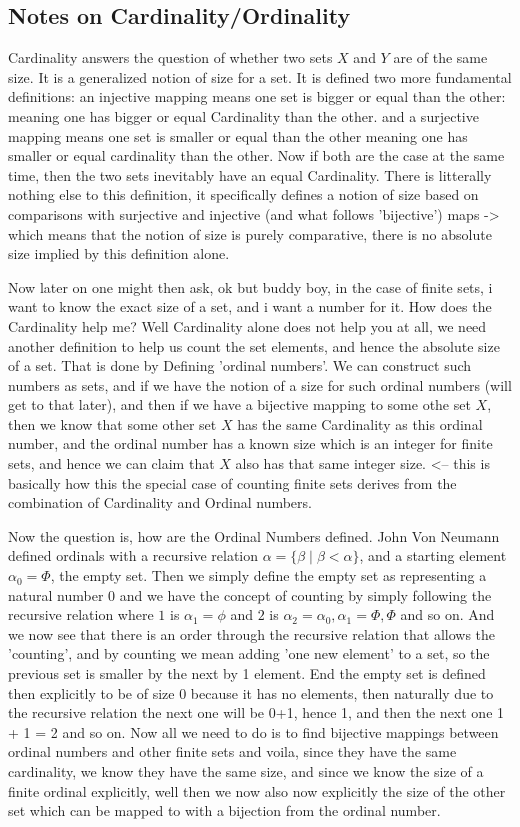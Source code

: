 \documentclass[11pt,a4paper]{article}
\begin{document}
\subsection{Notes on Cardinality/Ordinality}
Cardinality answers the question of whether two sets $X$ and $Y$ are of the same size.
It is a generalized notion of size for a set. It is defined two more fundamental
definitions: an injective mapping means one set is bigger or equal than the other:
meaning one has bigger or equal Cardinality than the other.
and a surjective mapping means one set is smaller or equal than the other meaning one
has smaller or equal cardinality than the other. Now
if both are the case at the same time, then the two sets inevitably have an equal Cardinality.
There is litterally nothing else to this definition, it specifically defines a notion
of size based on comparisons with surjective and injective (and what follows 'bijective')
maps -> which means that the notion of size is purely comparative, there is no absolute
size implied by this definition alone.

Now later on one might then ask, ok but buddy boy, in the case of finite sets, i want to
know the exact size of a set, and i want a number for it. How does the Cardinality help
me? Well Cardinality alone does not help you at all, we need another definition to help
us count the set elements, and hence the absolute size of a set. That is done by Defining
'ordinal numbers'. We can construct such numbers as sets, and if we have the notion of
a size for such ordinal numbers (will get to that later), and then if we have a bijective
mapping to some othe set $X$, then we know that some other set $X$ has the same Cardinality
as this ordinal number, and the ordinal number has a known size which is an integer for finite
sets, and hence we can claim that $X$ also has that same integer size. <-- this is basically
how this the special case of counting finite sets derives from the combination of Cardinality
and Ordinal numbers.

Now the question is, how are the Ordinal Numbers defined. John Von Neumann defined ordinals
with a recursive relation $ \alpha = \{ \beta \mid \beta < \alpha  \}$, and a starting
element $\alpha_0 = \Phi$, the empty set. Then we simply define the empty set as representing
a natural number $0$ and we have the concept of counting by simply following the recursive
relation where $1$ is $\alpha_1 = {\phi}$ and $2$ is $\alpha_2 = { \alpha_0, \alpha_1 } = {\Phi, {\Phi}}$
and so on. And we now see that there is an order through the recursive relation that allows the 'counting',
and by counting we mean adding 'one new element' to a set, so the previous set is smaller by the next by
1 element. End the empty set is defined then explicitly to be of size 0 because it has no elements, then
naturally due to the recursive relation the next one will be 0+1, hence 1, and then the next one 1 + 1 = 2
and so on. Now all we need to do is to find bijective mappings between ordinal numbers and other finite
sets and voila, since they have the same cardinality, we know they have the same size, and since we know
the size of a finite ordinal explicitly, well then we now also now explicitly the size of the other set
which can be mapped to with a bijection from the ordinal number.
\end{document}
